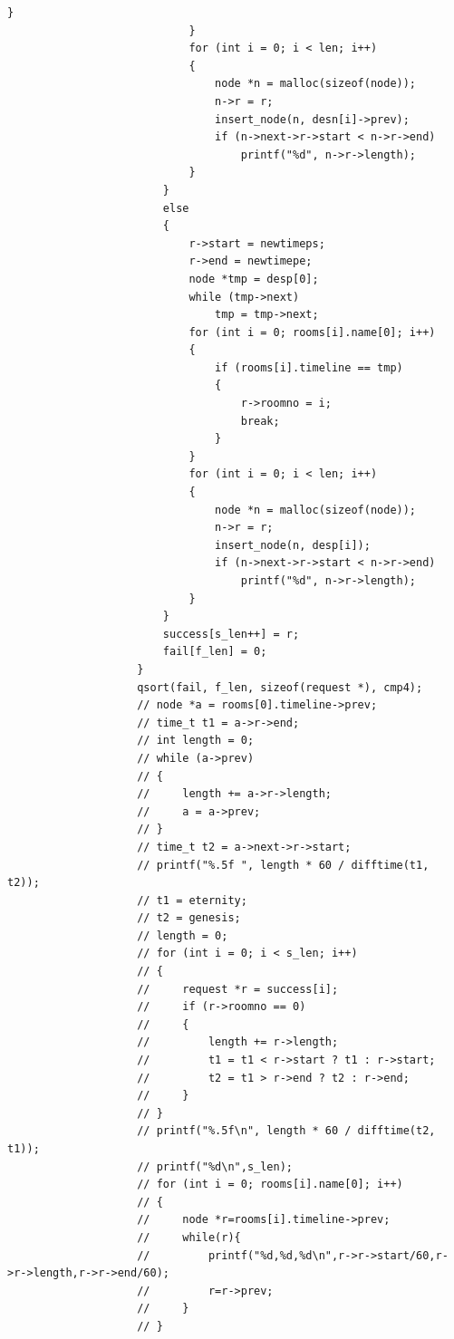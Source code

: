 \documentclass{article}
\begin{document}
\begin{Verbatim}[gobble=8]
                                }
                            }
                            for (int i = 0; i < len; i++)
                            {
                                node *n = malloc(sizeof(node));
                                n->r = r;
                                insert_node(n, desn[i]->prev);
                                if (n->next->r->start < n->r->end)
                                    printf("%d", n->r->length);
                            }
                        }
                        else
                        {
                            r->start = newtimeps;
                            r->end = newtimepe;
                            node *tmp = desp[0];
                            while (tmp->next)
                                tmp = tmp->next;
                            for (int i = 0; rooms[i].name[0]; i++)
                            {
                                if (rooms[i].timeline == tmp)
                                {
                                    r->roomno = i;
                                    break;
                                }
                            }
                            for (int i = 0; i < len; i++)
                            {
                                node *n = malloc(sizeof(node));
                                n->r = r;
                                insert_node(n, desp[i]);
                                if (n->next->r->start < n->r->end)
                                    printf("%d", n->r->length);
                            }
                        }
                        success[s_len++] = r;
                        fail[f_len] = 0;
                    }
                    qsort(fail, f_len, sizeof(request *), cmp4);
                    // node *a = rooms[0].timeline->prev;
                    // time_t t1 = a->r->end;
                    // int length = 0;
                    // while (a->prev)
                    // {
                    //     length += a->r->length;
                    //     a = a->prev;
                    // }
                    // time_t t2 = a->next->r->start;
                    // printf("%.5f ", length * 60 / difftime(t1, t2));
                    // t1 = eternity;
                    // t2 = genesis;
                    // length = 0;
                    // for (int i = 0; i < s_len; i++)
                    // {
                    //     request *r = success[i];
                    //     if (r->roomno == 0)
                    //     {
                    //         length += r->length;
                    //         t1 = t1 < r->start ? t1 : r->start;
                    //         t2 = t1 > r->end ? t2 : r->end;
                    //     }
                    // }
                    // printf("%.5f\n", length * 60 / difftime(t2, t1));
                    // printf("%d\n",s_len);
                    // for (int i = 0; rooms[i].name[0]; i++)
                    // {
                    //     node *r=rooms[i].timeline->prev;
                    //     while(r){
                    //         printf("%d,%d,%d\n",r->r->start/60,r->r->length,r->r->end/60);
                    //         r=r->prev;
                    //     }
                    // }
                

\end{Verbatim}
\end{document}
